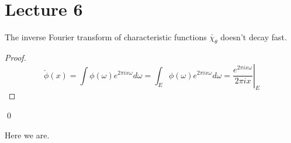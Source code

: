 \section*{Lecture 6}

\begin{proposition}
    The inverse Fourier transform of characteristic functions $\check{\chi_\theta}$ doesn't decay fast. 
\end{proposition}
\begin{proof}
\begin{equation*}
    \check{\phi}(x)=\int\phi(\omega)e^{2\pi ix\omega}d\omega=\int_E\phi(\omega)e^{2\pi ix\omega}d\omega=\left.\frac{e^{2\pi ix\omega}}{2\pi ix}\right\vert_E
\end{equation*}
\end{proof}
\qed

Here we are. 